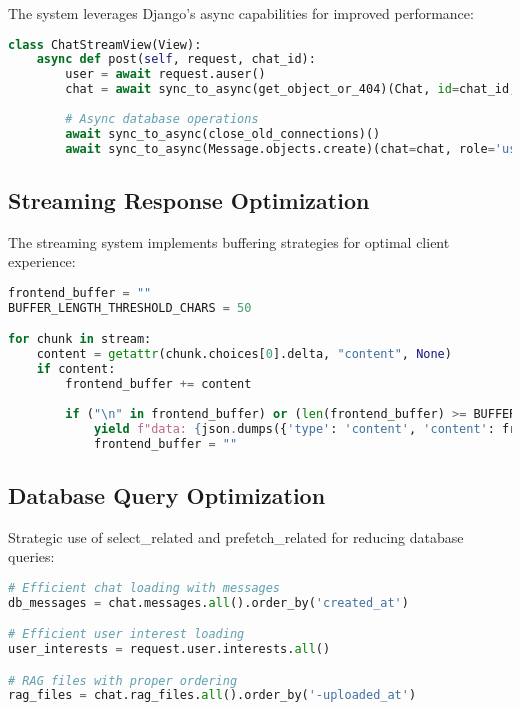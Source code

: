 \documentclass[12pt,a4paper]{article}
\begin{document}
The system leverages Django's async capabilities for improved performance:

\begin{lstlisting}[language=Python, caption=Async Implementation Example]
class ChatStreamView(View):
    async def post(self, request, chat_id):
        user = await request.auser()
        chat = await sync_to_async(get_object_or_404)(Chat, id=chat_id, user=user)
        
        # Async database operations
        await sync_to_async(close_old_connections)()
        await sync_to_async(Message.objects.create)(chat=chat, role='user', content=content)
\end{lstlisting}

\subsection{Streaming Response Optimization}

The streaming system implements buffering strategies for optimal client experience:

\begin{lstlisting}[language=Python, caption=Streaming Buffer Management]
frontend_buffer = ""
BUFFER_LENGTH_THRESHOLD_CHARS = 50

for chunk in stream:
    content = getattr(chunk.choices[0].delta, "content", None)
    if content:
        frontend_buffer += content
        
        if ("\n" in frontend_buffer) or (len(frontend_buffer) >= BUFFER_LENGTH_THRESHOLD_CHARS):
            yield f"data: {json.dumps({'type': 'content', 'content': frontend_buffer})}\n\n"
            frontend_buffer = ""
\end{lstlisting}

\subsection{Database Query Optimization}

Strategic use of select\_related and prefetch\_related for reducing database queries:

\begin{lstlisting}[language=Python, caption=Query Optimization Examples]
# Efficient chat loading with messages
db_messages = chat.messages.all().order_by('created_at')

# Efficient user interest loading
user_interests = request.user.interests.all()

# RAG files with proper ordering
rag_files = chat.rag_files.all().order_by('-uploaded_at')
\end{lstlisting}
\end{document}

